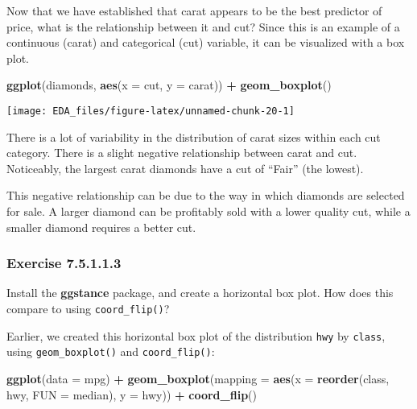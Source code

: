 \documentclass[]{book}
\newenvironment{Shaded}{\begin{snugshade}}{\end{snugshade}}
\newcommand{\DataTypeTok}[1]{\textcolor[rgb]{0.13,0.29,0.53}{#1}}
\newcommand{\KeywordTok}[1]{\textcolor[rgb]{0.13,0.29,0.53}{\textbf{#1}}}
\newcommand{\NormalTok}[1]{#1}
\newcommand{\OperatorTok}[1]{\textcolor[rgb]{0.81,0.36,0.00}{\textbf{#1}}}
\newcommand{\StringTok}[1]{\textcolor[rgb]{0.31,0.60,0.02}{#1}}
\theoremstyle{plain}
\theoremstyle{remark}
\begin{document}
Now that we have established that carat appears to be the best predictor
of price, what is the relationship between it and cut? Since this is an
example of a continuous (carat) and categorical (cut) variable, it can
be visualized with a box plot.

\begin{Shaded}
\begin{Highlighting}[]
\KeywordTok{ggplot}\NormalTok{(diamonds, }\KeywordTok{aes}\NormalTok{(}\DataTypeTok{x =}\NormalTok{ cut, }\DataTypeTok{y =}\NormalTok{ carat)) }\OperatorTok{+}
\StringTok{  }\KeywordTok{geom_boxplot}\NormalTok{()}
\end{Highlighting}
\end{Shaded}

\begin{center}\texttt{[image: EDA\_files/figure-latex/unnamed-chunk-20-1]} \end{center}

There is a lot of variability in the distribution of carat sizes within
each cut category. There is a slight negative relationship between carat
and cut. Noticeably, the largest carat diamonds have a cut of ``Fair''
(the lowest).

This negative relationship can be due to the way in which diamonds are
selected for sale. A larger diamond can be profitably sold with a lower
quality cut, while a smaller diamond requires a better cut.

\hypertarget{exercise-7.5.1.1.3}{%
\subsubsection*{\texorpdfstring{Exercise
{7.5.1.1.3}}{Exercise 7.5.1.1.3}}\label{exercise-7.5.1.1.3}}

Install the \textbf{ggstance} package, and create a horizontal box plot.
How does this compare to using \texttt{coord\_flip()}?

Earlier, we created this horizontal box plot of the distribution
\texttt{hwy} by \texttt{class}, using \texttt{geom\_boxplot()} and
\texttt{coord\_flip()}:

\begin{Shaded}
\begin{Highlighting}[]
\KeywordTok{ggplot}\NormalTok{(}\DataTypeTok{data =}\NormalTok{ mpg) }\OperatorTok{+}
\StringTok{  }\KeywordTok{geom_boxplot}\NormalTok{(}\DataTypeTok{mapping =} \KeywordTok{aes}\NormalTok{(}\DataTypeTok{x =} \KeywordTok{reorder}\NormalTok{(class, hwy, }\DataTypeTok{FUN =}\NormalTok{ median), }\DataTypeTok{y =}\NormalTok{ hwy)) }\OperatorTok{+}
\StringTok{  }\KeywordTok{coord_flip}\NormalTok{()}
\end{Highlighting}
\end{Shaded}
\end{document}

